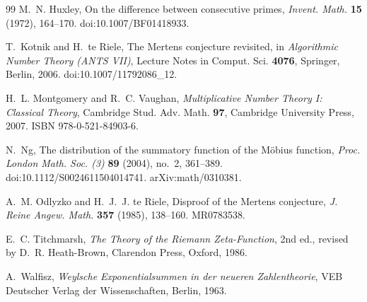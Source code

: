 \documentclass[11pt]{amsart}
\numberwithin{equation}{section}
\theoremstyle{plain}
\theoremstyle{definition}
\theoremstyle{remark}
\begin{document}
\begin{thebibliography}{99}
M.~N. Huxley, On the difference between consecutive primes,
\emph{Invent. Math.} \textbf{15} (1972), 164--170.
doi:10.1007/BF01418933.

T.~Kotnik and H.~te Riele, The Mertens conjecture revisited, in
\emph{Algorithmic Number Theory (ANTS VII)}, Lecture Notes in Comput. Sci.
\textbf{4076}, Springer, Berlin, 2006. doi:10.1007/11792086\_12.

H.~L. Montgomery and R.~C. Vaughan, \emph{Multiplicative Number Theory I:
Classical Theory}, Cambridge Stud. Adv. Math. \textbf{97}, Cambridge
University Press, 2007. ISBN 978-0-521-84903-6.

N.~Ng, The distribution of the summatory function of the M\"obius function,
\emph{Proc. London Math. Soc. (3)} \textbf{89} (2004), no.~2, 361--389.
doi:10.1112/S0024611504014741. arXiv:math/0310381.

A.~M. Odlyzko and H.~J.~J. te Riele, Disproof of the Mertens conjecture,
\emph{J. Reine Angew. Math.} \textbf{357} (1985), 138--160. MR0783538.

E.~C. Titchmarsh, \emph{The Theory of the Riemann Zeta-Function}, 2nd ed.,
revised by D.~R. Heath-Brown, Clarendon Press, Oxford, 1986.

A.~Walfisz, \emph{Weylsche Exponentialsummen in der neueren Zahlentheorie},
VEB Deutscher Verlag der Wissenschaften, Berlin, 1963.

\end{thebibliography}
\end{document}
